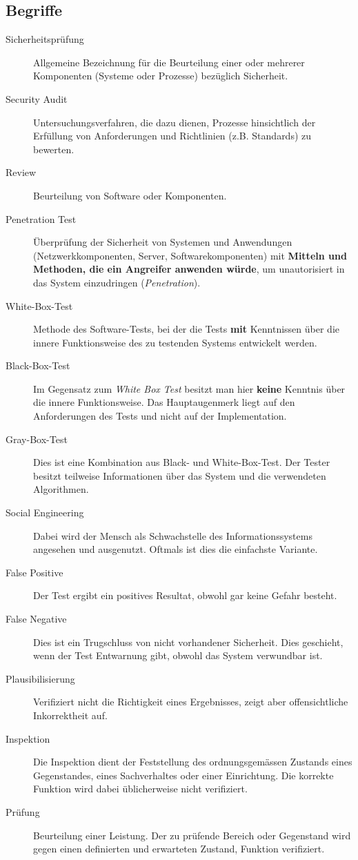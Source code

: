 \subsection{Begriffe}

\begin{description}
	\item[Sicherheitsprüfung] Allgemeine Bezeichnung für die Beurteilung einer oder mehrerer Komponenten (Systeme oder Prozesse) bezüglich Sicherheit.
	\item[Security Audit] Untersuchungsverfahren, die dazu dienen, Prozesse hinsichtlich der Erfüllung von Anforderungen und Richtlinien (z.B. Standards) zu bewerten.
	\item[Review] Beurteilung von Software oder Komponenten.
	\item[Penetration Test] Überprüfung der Sicherheit von Systemen und Anwendungen (Netzwerkkomponenten, Server, Softwarekomponenten) mit \textbf{Mitteln und Methoden, die ein Angreifer anwenden würde}, um unautorisiert in das System einzudringen (\textit{Penetration}).
	\item[White-Box-Test] Methode des Software-Tests, bei der die Tests \textbf{mit} Kenntnissen über die innere Funktionsweise des zu testenden Systems entwickelt werden.
	\item[Black-Box-Test] Im Gegensatz zum \textit{White Box Test} besitzt man hier \textbf{keine} Kenntnis über die innere Funktionsweise. Das Hauptaugenmerk liegt auf den Anforderungen des Tests und nicht auf der Implementation.
	\item[Gray-Box-Test] Dies ist eine Kombination aus Black- und White-Box-Test. Der Tester besitzt teilweise Informationen über das System und die verwendeten Algorithmen.
	\item[Social Engineering] Dabei wird der Mensch als Schwachstelle des Informationssystems angesehen und ausgenutzt. Oftmals ist dies die einfachste Variante.
	\item[False Positive] Der Test ergibt ein positives Resultat, obwohl gar keine Gefahr besteht.
	\item[False Negative] Dies ist ein Trugschluss von nicht vorhandener Sicherheit. Dies geschieht, wenn der Test Entwarnung gibt, obwohl das System verwundbar ist.
	\item[Plausibilisierung] Verifiziert nicht die Richtigkeit eines Ergebnisses, zeigt aber offensichtliche Inkorrektheit auf.
	\item[Inspektion] Die Inspektion dient der Feststellung des ordnungsgemässen Zustands eines Gegenstandes, eines Sachverhaltes oder einer Einrichtung. Die korrekte Funktion wird dabei üblicherweise nicht verifiziert.
	\item[Prüfung] Beurteilung einer Leistung. Der zu prüfende Bereich oder Gegenstand wird gegen einen definierten und erwarteten Zustand, Funktion verifiziert.
\end{description}

